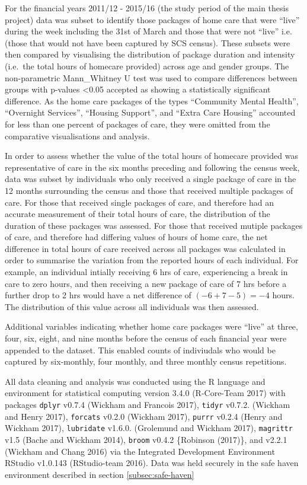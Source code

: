 \documentclass[]{article}
\begin{document}
For the financial years 2011/12 - 2015/16 (the study period of the main
thesis project) data was subset to identify those packages of home care
that were ``live'' during the week including the 31st of March and those
that were not ``live'' i.e. (those that would not have been captured by
SCS census). These subsets were then compared by visualising the
distribution of package duration and intensity (i.e.~the total hours of
homecare provided) across age and gender groups. The non-parametric
Mann\_Whitney U test was used to compare differences between groups with
p-values \textless{}0.05 accepted as showing a statistically significant
difference. As the home care packages of the types ``Community Mental
Health'', ``Overnight Services'', ``Housing Support'', and ``Extra Care
Housing'' accounted for less than one percent of packages of care, they
were omitted from the comparative visualisations and analysis.

In order to assess whether the value of the total hours of homecare
provided was representative of care in the six months preceding and
following the census week, data was subset by individuals who only
received a single package of care in the 12 months surrounding the
census and those that received multiple packages of care. For those that
received single packages of care, and therefore had an accurate
measurement of their total hours of care, the distribution of the
duration of these packages was assessed. For those that received mutiple
packages of care, and therefore had differing values of hours of home
care, the net difference in total hours of care received across all
packages was calculated in order to summarise the variation from the
reported hours of each individual. For example, an individual intially
receiving 6 hrs of care, experiencing a break in care to zero hours, and
then receiving a new package of care of 7 hrs before a further drop to 2
hrs would have a net difference of \((-6 + 7 - 5) = -4\) hours. The
distribution of this value across all individuals was then assessed.

Additional variables indicating whether home care packages were ``live''
at three, four, six, eight, and nine months before the census of each
financial year were appended to the dataset. This enabled counts of
indiviudals who would be captured by six-monthly, four monthly, and
three monthly census repetitions.

All data cleaning and analysis was conducted using the R language and
environment for statistical computing version 3.4.0 (R-Core-Team 2017)
with packages \texttt{dplyr} v0.7.4 (Wickham and Francois 2017),
\texttt{tidyr} v0.7.2. (Wickham and Henry 2017), \texttt{forcats} v0.2.0
(Wickham 2017), \texttt{purrr} v0.2.4 (Henry and Wickham 2017),
\texttt{lubridate} v1.6.0. (Grolemund and Wickham 2017),
\texttt{magrittr} v1.5 (Bache and Wickham 2014), \texttt{broom} v0.4.2
\{Robinson (2017)\}, and  v2.2.1 (Wickham and Chang 2016)
via the Integrated Development Environment RStudio v1.0.143
(RStudio-team 2016). Data was held securely in the safe haven
environment described in section \ref{subsec:safe-haven}
\end{document}
